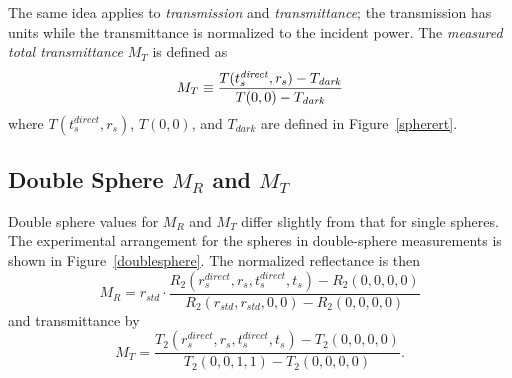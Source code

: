 \documentclass{article}
\newcommand\rdirect{r_s^{\mathit{direct}}}
\newcommand\rdiffuse{r_s}
\newcommand\tdirect{t_s^{\mathit{direct}}}
\newcommand\tdiffuse{t_s}
\begin{document}
The same idea applies to \textit{transmission} and \textit{transmittance}; the transmission
has units while the transmittance is normalized to the incident power.  The \textit{measured
total transmittance}  $M_T$ is defined as
\begin{equation}
M_T \equiv {{T(\tdirect, \rdiffuse) - T_{\mathit{dark}}\over 
                    T(0, 0) - T_{\mathit{dark}}} }
\label{eqmt}
\end{equation}
where $T(\tdirect, \rdiffuse)$, $T(0, 0)$, 
and $T_{\mathit{dark}}$ are defined in Figure~\ref{spherert}. 

\subsection{Double Sphere $M_R$ and $M_T$}

Double sphere values for $M_R$ and $M_T$ differ slightly from that for single spheres.  The experimental arrangement for the spheres in double-sphere measurements is shown in Figure~\ref{doublesphere}.  The normalized reflectance is then 
\begin{equation}
M_R = r_{\mathit{std}}\cdot{\frac{R_2(\rdirect, \rdiffuse, \tdirect, \tdiffuse)-R_2(0,0, 0,0)}{R_2(r_{\mathit{std}}, r_{\mathit{std}}, 0, 0)-R_2(0,0, 0,0)}}
\end{equation}
and transmittance by
\begin{equation}
M_T = {\frac{T_2(\rdirect, \rdiffuse, \tdirect, \tdiffuse)-T_2(0,0, 0,0) }{T_2(0, 0, 1, 1)-T_2(0,0, 0,0)}}.
\end{equation}
\end{document}
